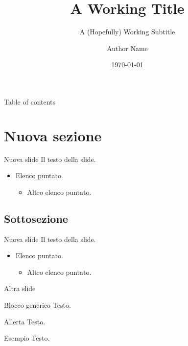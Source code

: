 \documentclass{beamer}
\title{A Working Title}
\subtitle{A (Hopefully) Working Subtitle}
\author{Author Name}
\date{\today}
\begin{document}
\begin{frame}
    \maketitle
\end{frame}

\begin{frame}{Table of contents}
    \tableofcontents
\end{frame}

\section{Nuova sezione}
\begin{frame}{Nuova slide}
    Il testo della slide.
    \begin{itemize}
        \item Elenco puntato.
        \begin{itemize}
            \item Altro elenco puntato.
        \end{itemize}
    \end{itemize}
\end{frame}

\subsection{Sottosezione}
\begin{frame}{Nuova slide}
    Il testo della slide.
    \begin{itemize}
        \item Elenco puntato.
        \begin{itemize}
            \item Altro elenco puntato.
        \end{itemize}
    \end{itemize}
\end{frame}

\begin{frame}[nonumber]
\end{frame}

\begin{frame}[plain]
\end{frame}

\begin{frame}{Altra slide}
    \begin{block}{Blocco generico}
        Testo.
    \end{block}

    \begin{alertblock}{Allerta}
        Testo.
    \end{alertblock}

    \begin{exampleblock}{Esempio}
        Testo.
    \end{exampleblock}
\end{frame}
\end{document}
